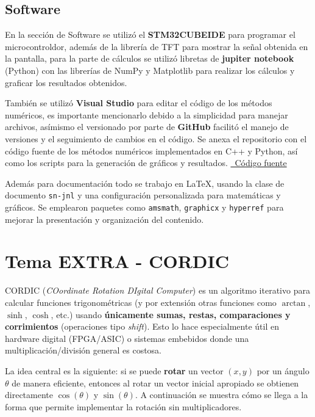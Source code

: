 \documentclass[pdflatex,sn-mathphys-num]{sn-jnl}%
\begin{document}
\subsection{Software}
En la sección de Software se utilizó el \textbf{STM32CUBEIDE} para programar el microcontroldor, además de la librería de TFT para mostrar la señal obtenida en la pantalla, para la parte de cálculos se utilizó libretas de \textbf{jupiter notebook} (Python) con las librerías de NumPy y Matplotlib para realizar los cálculos y graficar los resultados obtenidos.

También se utilizó \textbf{Visual Studio} para editar el código de los métodos numéricos, es importante mencionarlo debido a la simplicidad para manejar archivos, asímismo el versionado por parte de \textbf{GitHub} facilitó el manejo de versiones y el seguimiento de cambios en el código. Se anexa el repositorio con el código fuente de los métodos numéricos implementados en C++ y Python, así como los scripts para la generación de gráficos y resultados.
\href{https://github.com/DasReyxr/C-Cpp/tree/main/Metodos/3ExamenTrapecioRaltson}{\faGithub\ Código fuente}



Además para documentación todo se trabajo en \LaTeX, usando la clase de documento \texttt{sn-jnl} y una configuración personalizada para matemáticas y gráficos. Se emplearon paquetes como \texttt{amsmath}, \texttt{graphicx} y \texttt{hyperref} para mejorar la presentación y organización del contenido.

\newpage
\section{Tema EXTRA - CORDIC}
CORDIC (\textit{COordinate Rotation DIgital Computer}) es un algoritmo iterativo para calcular funciones trigonométricas (y por extensión otras funciones como $\arctan$, $\sinh$, $\cosh$, etc.) usando \textbf{únicamente sumas, restas, comparaciones y corrimientos} (operaciones tipo \textit{shift}). Esto lo hace especialmente útil en hardware digital (FPGA/ASIC) o sistemas embebidos donde una multiplicación/división general es costosa.

La idea central es la siguiente: si se puede \textbf{rotar} un vector $(x,y)$ por un ángulo $\theta$ de manera eficiente, entonces al rotar un vector inicial apropiado se obtienen directamente $\cos(\theta)$ y $\sin(\theta)$. A continuación se muestra cómo se llega a la forma que permite implementar la rotación sin multiplicadores.
\end{document}
